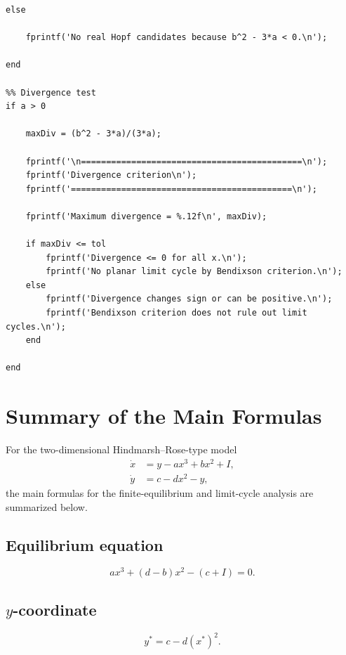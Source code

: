 \documentclass[11pt,a4paper]{article}
\begin{document}
\begin{verbatim}
else

    fprintf('No real Hopf candidates because b^2 - 3*a < 0.\n');

end

%% Divergence test
if a > 0

    maxDiv = (b^2 - 3*a)/(3*a);

    fprintf('\n============================================\n');
    fprintf('Divergence criterion\n');
    fprintf('============================================\n');

    fprintf('Maximum divergence = %.12f\n', maxDiv);

    if maxDiv <= tol
        fprintf('Divergence <= 0 for all x.\n');
        fprintf('No planar limit cycle by Bendixson criterion.\n');
    else
        fprintf('Divergence changes sign or can be positive.\n');
        fprintf('Bendixson criterion does not rule out limit cycles.\n');
    end

end
\end{verbatim}

\section*{Summary of the Main Formulas}

For the two-dimensional Hindmarsh--Rose-type model
\begin{equation}
\boxed{
\begin{aligned}
\dot{x}&=y-a x^3+b x^2+I,\\
\dot{y}&=c-dx^2-y,
\end{aligned}}
\end{equation}
the main formulas for the finite-equilibrium and limit-cycle analysis
are summarized below.

\subsection*{Equilibrium equation}

\begin{equation}
\boxed{
a x^3+(d-b)x^2-(c+I)=0.
}
\end{equation}

\subsection*{$y$-coordinate}

\begin{equation}
\boxed{
y^*=c-d(x^*)^2.
}
\end{equation}
\end{document}
